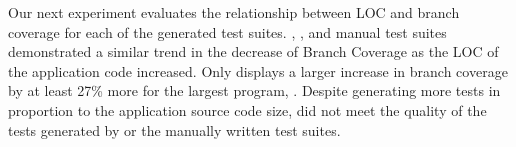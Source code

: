 
Our next experiment evaluates the relationship between LOC and branch coverage for each of the generated test suites.  \evo, \codepro, and manual test suites demonstrated a similar trend in the decrease of Branch Coverage as the LOC of the application code increased. Only \codepro displays a larger increase in branch coverage by at least 27\%  more for the largest program, \netweaver. Despite generating more tests in proportion to the application source code size,  \codepro did not meet the quality of the tests generated by \evo or the manually written test suites.

